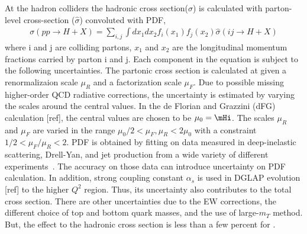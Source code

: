 At the hadron colliders the hadronic cross section($\sigma$) is calculated with 
parton-level cross-section ($\hat{\sigma}$) convoluted with PDF, 
\begin{eqnarray} 
\sigma (pp \rightarrow H+X) 
= 
\sum_{i,j} \int dx_1 dx_2 f_i(x_1) f_j(x_2) 
\hat{\sigma} \left( ij \rightarrow H+X \right)
\end{eqnarray} 
where i and j are colliding partons, 
$x_1$ and $x_2$ are the longitudinal momentum fractions carried by parton i and j. 
Each component in the equation is subject to the following uncertainties.
The partonic cross section is calculated at given
a renormalizaion scale $\mu_R$ and a factorization scale $\mu_F$. 
Due to possible missing higher-order QCD radiative corrections,
the uncertainty is estimated by varying the scales around 
the central values. In the de Florian and Grazzini (dFG) 
calculation [ref], the central values are chosen to be $\mu_0 = \mHi$. 
The scales $\mu_R$ and $\mu_F$ are varied in the range 
$\mu_0/2 < \mu_F, \mu_R < 2\mu_0$ 
with a constraint $1/2 < \mu_F/\mu_R < 2$. 
PDF is obtained by fitting on data measured in deep-inelastic scattering, 
Drell-Yan, and jet production from a wide variety of different experiments~\cite{}. 
The accuracy on those data can introduce uncertainty on PDF calculation. 
In addition, strong coupling constant $\alpha_s$ is used in DGLAP evolution [ref] 
to the higher $Q^2$ region. Thus, its uncertainty also contributes to 
the total cross section. There are other uncertainties due to 
the EW corrections, the different choice of top and bottom quark masses, 
and the use of large-$m_T$ method. But, the effect to the 
hadronic cross section is less than a few percent \cite{Dittmaier:2012vm}
for \ggH.

